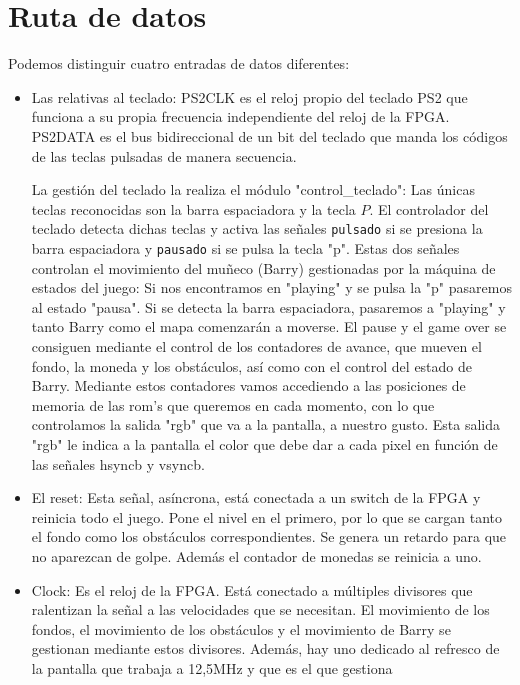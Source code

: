 \documentclass[11pt, a4paper, spanish, openright, twoside]{book}
\begin{document}
\newpage
\mbox{}
\thispagestyle{empty}						%
\newpage


\tableofcontents 							%

\newpage


\vspace{3cm}


\section{Ruta de datos}
	Podemos distinguir cuatro entradas de datos diferentes:
	\begin{itemize}	
	\item Las relativas al teclado: PS2CLK es el reloj propio del teclado PS2 que funciona a  su propia frecuencia independiente 
 	del reloj de la FPGA. PS2DATA es el bus bidireccional de un bit del teclado que manda los códigos de las teclas pulsadas de manera secuencia.
	
	La gestión del teclado la realiza el módulo "control\_teclado":	Las únicas teclas reconocidas son la barra espaciadora y la tecla $P$. El controlador del teclado detecta dichas teclas y activa las señales \texttt{pulsado} si se presiona la barra espaciadora y \texttt{pausado} si se pulsa la tecla "p".	
	Estas dos señales controlan el movimiento del muñeco (Barry) gestionadas por la máquina de estados del juego: Si nos encontramos en "playing" y se pulsa la "p"  pasaremos al estado "pausa". Si se detecta la barra espaciadora, pasaremos
	 a "playing" y tanto Barry como el mapa comenzarán a moverse. El pause y el game over se consiguen mediante el control de los contadores de avance, que mueven el fondo, la moneda y los obstáculos, así como con el control del estado de Barry.
	Mediante estos contadores vamos accediendo a las posiciones de memoria de las rom's que queremos en cada momento, con lo que controlamos la salida "rgb"  que va a la pantalla, a nuestro gusto. Esta salida "rgb" le indica a la pantalla el color que debe dar a cada pixel
	en función de las señales hsyncb y vsyncb.

	\item El reset:	Esta señal, asíncrona, está conectada a un switch de la FPGA y reinicia todo el juego. Pone el nivel en el primero, por lo que se cargan tanto el fondo como los obstáculos correspondientes. Se genera un retardo para que no aparezcan de golpe. Además el contador de monedas se reinicia a uno.
	\item Clock: Es el reloj de la FPGA. Está conectado a múltiples divisores que ralentizan la señal a las velocidades que se necesitan. El movimiento de los fondos, el movimiento de los obstáculos y el movimiento de Barry se gestionan mediante
	estos divisores. Además, hay uno dedicado al refresco de la pantalla que trabaja a 12,5MHz y que es el que gestiona
	
\end{itemize}
\end{document}
